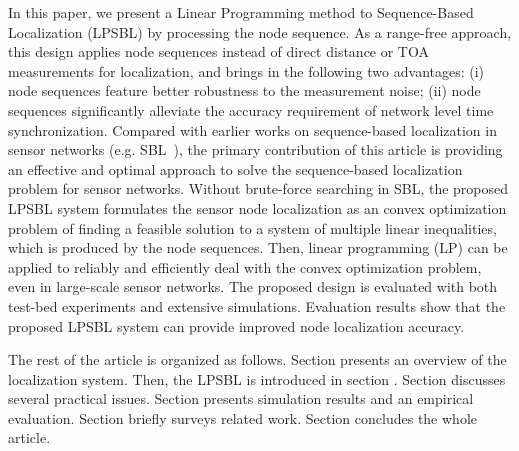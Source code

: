 In this paper, we present a Linear Programming method to Sequence-Based Localization (LPSBL) by processing the node sequence. 
As a range-free approach, this design applies node sequences instead of direct distance
or TOA measurements for localization, and brings in the following two advantages: (i) node sequences feature better
robustness to the measurement noise; (ii) node sequences significantly alleviate the accuracy requirement of network level time synchronization. 
Compared with earlier works on sequence-based localization in sensor
networks (e.g. SBL~\cite{yedavalli2008sequence}), the primary contribution
of this article is providing an effective and optimal approach
to solve the sequence-based localization problem for sensor networks. 
Without brute-force searching in SBL, the proposed LPSBL system formulates the
sensor node localization as an convex optimization problem
of finding a feasible solution to a system of multiple linear
inequalities, which is produced by the node sequences.
Then, linear programming (LP) can be applied to reliably
and efficiently deal with the convex optimization problem,
even in large-scale sensor networks. The proposed design
is evaluated with both test-bed experiments and extensive
simulations. Evaluation results show that the proposed
LPSBL system can provide improved node localization
accuracy.


The rest of the article is organized as follows. Section \uppercase\expandafter{} presents an overview of the  localization system.
Then, the LPSBL is introduced in section \uppercase\expandafter{}.
Section \uppercase\expandafter{} discusses several practical issues.
Section \uppercase\expandafter{} presents simulation results and an empirical evaluation. Section \uppercase\expandafter{} briefly surveys related work.
Section \uppercase\expandafter{} concludes the whole article.



